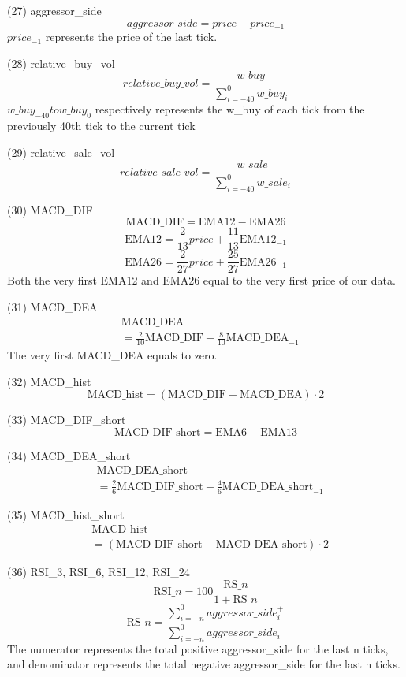 \documentclass[10pt, conference, compsocconf]{IEEEtran}
\begin{document}
\begin{enumerate}
	(27) aggressor\_side\\
	$$
		aggressor\_side = price - price_{-1}
	$$
	$price_{-1}$ represents the price of the last tick.


	(28) relative\_buy\_vol\\
	$$
		relative\_buy\_vol = \frac{w\_buy}{\sum_{i=-40}^{0}w\_buy_i}
	$$
	$w\_buy_{-40} to w\_buy_0$ respectively represents the w\_buy of each tick from the previously 40th tick to the current tick

	(29) relative\_sale\_vol\\
	$$
		relative\_sale\_vol = \frac{w\_sale}{\sum_{i=-40}^{0}w\_sale_i}
	$$

	(30) MACD\_DIF\\
	$$
		\text{MACD\_DIF} = \text{EMA12} - \text{EMA26}
	$$
	$$
		\text{EMA12} = \frac{2}{13}price + \frac{11}{13}\text{EMA12}_{-1}
	$$
	$$
		\text{EMA26} = \frac{2}{27}price + \frac{25}{27}\text{EMA26}_{-1}
	$$
	Both the very first EMA12 and EMA26 equal to the very first price of our data.

	(31) MACD\_DEA\\
	$$
	\begin{aligned}
		& \text{MACD\_DEA} \\
		&= \frac{2}{10}\text{MACD\_DIF} + \frac{8}{10}\text{MACD\_DEA}_{-1}
	\end{aligned}
	$$
	The very first MACD\_DEA equals to zero.

	(32) MACD\_hist\\
	$$
		\text{MACD\_hist} = (\text{MACD\_DIF} - \text{MACD\_DEA}) \cdot 2
	$$

	(33) MACD\_DIF\_short\\
	$$
		\text{MACD\_DIF\_short} = \text{EMA6} - \text{EMA13}
	$$

	(34) MACD\_DEA\_short
	$$
	\begin{aligned}
		&\text{MACD\_DEA\_short} \\
		&= \frac{2}{6}\text{MACD\_DIF\_short} + \frac{4}{6}\text{MACD\_DEA\_short}_{-1}
	\end{aligned}
	$$

	(35) MACD\_hist\_short
	$$
	\begin{aligned}
		&\text{MACD\_hist}\\
		&= (\text{MACD\_DIF\_short} - \text{MACD\_DEA\_short}) \cdot 2
	\end{aligned}
	$$

	(36) RSI\_3, RSI\_6, RSI\_12, RSI\_24\\
	$$
		\text{RSI}\_n = 100\frac{\text{RS}\_n}{1+\text{RS}\_n}
	$$
	$$
		\text{RS}\_n = \frac{\sum_{i=-n}^{0}aggressor\_side_i^+}{\sum_{i=-n}^{0}aggressor\_side_i^-}
	$$
	The numerator represents the total positive aggressor\_side for the last n ticks, and denominator represents the total negative aggressor\_side for the last n ticks.


\end{enumerate}
\end{document}
